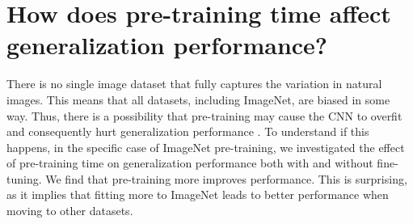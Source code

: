 \section{How does pre-training time affect generalization performance?}
\label{sec:speed}
There is no single image dataset that fully captures the variation in natural images. This means that all datasets, including ImageNet, are biased in some way. Thus, there is a possibility that pre-training may cause the CNN to overfit and consequently hurt generalization performance \cite{torralba2011unbiased}. To understand if this happens, in the specific case of ImageNet pre-training, we investigated the effect of pre-training time on generalization performance both with and without fine-tuning. We find that pre-training more improves performance. This is surprising, as it implies that fitting more to ImageNet leads to better performance when moving to other datasets. %

